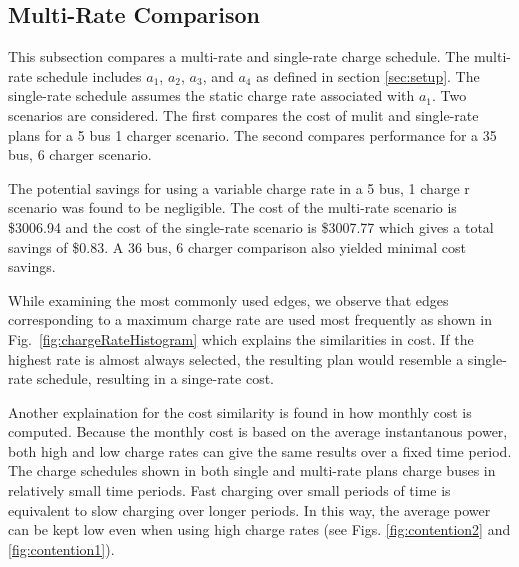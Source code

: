 \subsection{Multi-Rate Comparison}
This subsection compares a multi-rate and single-rate charge schedule. The multi-rate schedule includes $a_1$, $a_2$, $a_3$, and $a_4$ as defined in section \ref{sec:setup}.  The single-rate schedule assumes the static charge rate associated with $a_1$. Two scenarios are considered.  The first compares the cost of mulit and single-rate plans for a 5 bus 1 charger scenario. The second compares performance for a 35 bus, 6 charger scenario. 
\par The potential savings for using a variable charge rate in a 5 bus, 1 charge r scenario was found to be negligible.  The cost of the multi-rate scenario is \$3006.94 and the cost of the single-rate scenario is \$3007.77 which gives a total savings of \$0.83.
A 36 bus, 6 charger comparison also yielded minimal cost savings. 
\par While examining the most commonly used edges, we observe that edges corresponding to a maximum charge rate are used most frequently as shown in Fig.~\ref{fig:chargeRateHistogram} which explains the similarities in cost. If the highest rate is almost always selected, the resulting plan would resemble a single-rate schedule, resulting in a singe-rate cost.  
\par Another explaination for the cost similarity is found in how monthly cost is computed. Because the monthly cost is based on the average instantanous power, both high and low charge rates can give the same results over a fixed time period. The charge schedules shown in both single and multi-rate plans charge buses in relatively small time periods. Fast charging over small periods of time is equivalent to slow charging over longer periods. In this way, the average power can be kept low even when using high charge rates (see Figs. \ref{fig:contention2} and \ref{fig:contention1}). 
